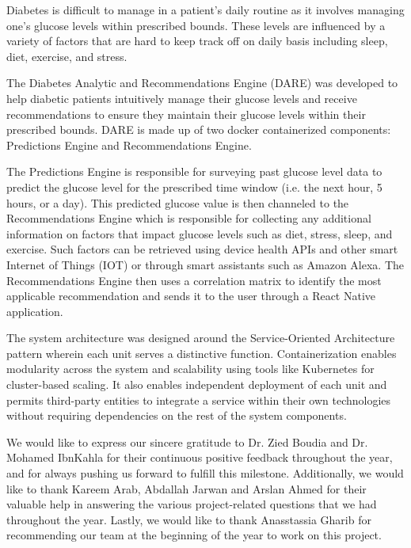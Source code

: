 \beforepreface


Diabetes is difficult to manage in a patient's daily routine as it involves managing one’s glucose levels within prescribed bounds. These levels are influenced by a variety of factors that are hard to keep track off on daily basis including sleep, diet, exercise, and stress.

The Diabetes Analytic and Recommendations Engine (DARE) was developed to help diabetic patients intuitively manage their glucose levels and receive recommendations to ensure they maintain their glucose levels within their prescribed bounds.  DARE is made up of two docker containerized components: Predictions Engine and Recommendations Engine.

The Predictions Engine is responsible for surveying past glucose level data to predict the glucose level for the prescribed time window (i.e. the next hour, 5 hours, or a day). This predicted glucose value is then channeled to the Recommendations Engine which is responsible for collecting any additional information on factors that impact glucose levels such as diet, stress, sleep, and exercise. Such factors can be retrieved using device health APIs and other smart Internet of Things (IOT) or through smart assistants such as Amazon Alexa. The Recommendations Engine then uses a correlation matrix to identify the most applicable recommendation and sends it to the user through a React Native application.

The system architecture was designed around the Service-Oriented Architecture pattern wherein each unit serves a distinctive function. Containerization enables modularity across the system and scalability using tools like Kubernetes for cluster-based scaling. It also enables independent deployment of each unit and permits third-party entities to integrate a service within their own technologies without requiring dependencies on the rest of the system components.

We would like to express our sincere gratitude to Dr. Zied Boudia and Dr. Mohamed IbnKahla for their continuous positive feedback throughout the year, and for always pushing us forward to fulfill this milestone. Additionally, we would like to thank Kareem Arab, Abdallah Jarwan and Arslan Ahmed for their valuable help in answering the various project-related questions that we had throughout the year. Lastly, we would like to thank Anasstassia Gharib for recommending our team at the beginning of the year to work on this project. 


